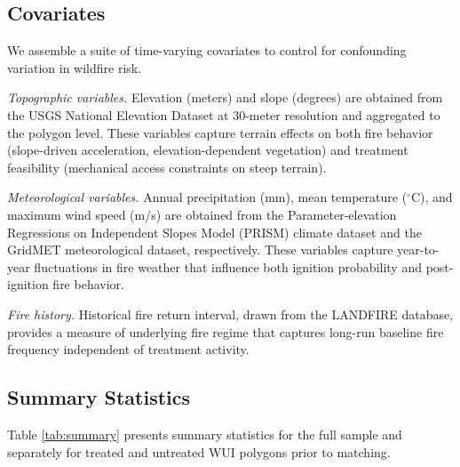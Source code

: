 \documentclass[12pt, letterpaper]{article}
\begin{document}
\subsection{Covariates}

We assemble a suite of time-varying covariates to control for confounding variation in wildfire risk.

\textit{Topographic variables.} Elevation (meters) and slope (degrees) are obtained from the USGS National Elevation Dataset at 30-meter resolution and aggregated to the polygon level. These variables capture terrain effects on both fire behavior (slope-driven acceleration, elevation-dependent vegetation) and treatment feasibility (mechanical access constraints on steep terrain).

\textit{Meteorological variables.} Annual precipitation (mm), mean temperature ($^\circ$C), and maximum wind speed (m/s) are obtained from the Parameter-elevation Regressions on Independent Slopes Model (PRISM) climate dataset and the GridMET meteorological dataset, respectively. These variables capture year-to-year fluctuations in fire weather that influence both ignition probability and post-ignition fire behavior.

\textit{Fire history.} Historical fire return interval, drawn from the LANDFIRE database, provides a measure of underlying fire regime that captures long-run baseline fire frequency independent of treatment activity.

\subsection{Summary Statistics}

Table \ref{tab:summary} presents summary statistics for the full sample and separately for treated and untreated WUI polygons prior to matching.
\end{document}
